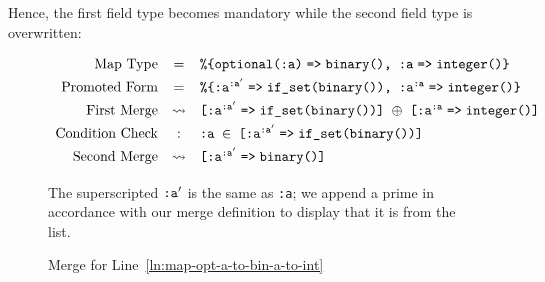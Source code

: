Hence, the first field type becomes mandatory while the second field type is overwritten:

\begin{figure}[H]
   \[\begin{array}{rcl}
      \text{Map Type} 
      &=& \texttt{\%\{optional(:a)\fto binary(), :a\fto integer()\}}
      \\[0.8ex]
      \text{Promoted Form}
      &=& \texttt{\%\{\prokey{:a}{$\prm{\texttt{:a}}$}\fto if\_set(binary()), \prokey{:a}{:a}\fto integer()\}}
      \\[0.8ex]
      \text{First Merge}
      &\leadsto& \texttt{[\prokey{:a}{$\prm{\texttt{:a}}$}\fto if\_set(binary())] $\oplus$ [\prokey{:a}{:a}\fto integer()]}
      \\[0.8ex]
      \text{Condition Check}
      &:& \texttt{:a $\in$ [\prokey{:a}{$\prm{\texttt{:a}}$}\fto if\_set(binary())]}
      \\[0.8ex]
      \text{Second Merge}
      &\leadsto& \texttt{[\prokey{:a}{$\prm{\texttt{:a}}$}\fto binary()]}
      \nl
   \end{array}\]
   The superscripted \texttt{$\texttt{:a}^{\prime}$} is the same as \texttt{:a}; we append a prime in accordance with our merge definition to display that it is from the list.
   \caption{Merge for Line~\ref{ln:map-opt-a-to-bin-a-to-int}}
\end{figure}
